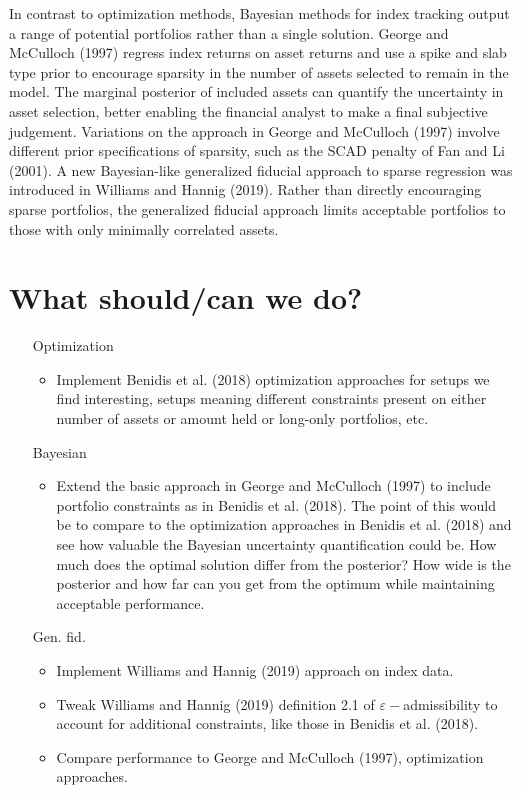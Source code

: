 \documentclass[a4paper, 12pt]{article}
\theoremstyle{plain}
\theoremstyle{definition}
\theoremstyle{remark}
\newcommand{\eps}{\varepsilon}
\begin{document}
In contrast to optimization methods, Bayesian methods for index tracking output a range of potential portfolios rather than a single solution.  George and McCulloch (1997) regress index returns on asset returns and use a spike and slab type prior to encourage sparsity in the number of assets selected to remain in the model.  The marginal posterior of included assets can quantify the uncertainty in asset selection, better enabling the financial analyst to make a final subjective judgement.  Variations on the approach in George and McCulloch (1997) involve different prior specifications of sparsity, such as the SCAD penalty of Fan and Li (2001).  A new Bayesian-like generalized fiducial approach to sparse regression was introduced in Williams and Hannig (2019).  Rather than directly encouraging sparse portfolios, the generalized fiducial approach limits acceptable portfolios to those with only minimally correlated assets.  
       

\section{What should/can we do?}

\begin{itemize}
	\item[Optimization]
		\begin{itemize}
		\item Implement Benidis et al. (2018) optimization approaches for setups we find interesting, setups meaning different constraints present on either number of assets or amount held or long-only portfolios, etc.
	\end{itemize}
	\item[Bayesian]
	\begin{itemize}
		\item Extend the basic approach in George and McCulloch (1997) to include portfolio constraints as in Benidis et al. (2018).  The point of this would be to compare to the optimization approaches in Benidis et al. (2018) and see how valuable the Bayesian uncertainty quantification could be.  How much does the optimal solution differ from the posterior?  How wide is the posterior and how far can you get from the optimum while maintaining acceptable performance.
	\end{itemize}
	\item[Gen. fid.]
		\begin{itemize}
			\item Implement Williams and Hannig (2019) approach on index data.
			\item Tweak Williams and Hannig (2019) definition 2.1 of $\eps-$admissibility to account for additional constraints, like those in Benidis et al. (2018).
			\item Compare performance to George and McCulloch (1997), optimization approaches.
	\end{itemize}
\end{itemize}
\end{document}
